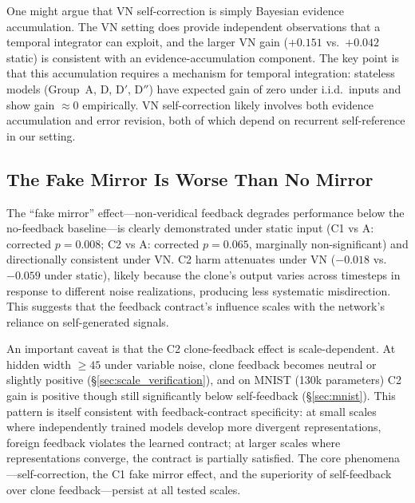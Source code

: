 \documentclass[10pt]{article}
\begin{document}
One might argue that VN self-correction is simply Bayesian evidence accumulation. The VN setting does provide independent observations that a temporal integrator can exploit, and the larger VN gain ($+0.151$ vs.\ $+0.042$ static) is consistent with an evidence-accumulation component. The key point is that this accumulation requires a mechanism for temporal integration: stateless models (Group~A, D, D$'$, D$''$) have expected gain of zero under i.i.d.\ inputs and show gain $\approx 0$ empirically. VN self-correction likely involves both evidence accumulation and error revision, both of which depend on recurrent self-reference in our setting.

\subsection{The Fake Mirror Is Worse Than No Mirror}

The ``fake mirror'' effect---non-veridical feedback degrades performance below the no-feedback baseline---is clearly demonstrated under static input (C1 vs A: corrected $p = 0.008$; C2 vs A: corrected $p = 0.065$, marginally non-significant) and directionally consistent under VN. C2 harm attenuates under VN ($-0.018$ vs.\ $-0.059$ under static), likely because the clone's output varies across timesteps in response to different noise realizations, producing less systematic misdirection. This suggests that the feedback contract's influence scales with the network's reliance on self-generated signals.

An important caveat is that the C2 clone-feedback effect is scale-dependent. At hidden width $\geq 45$ under variable noise, clone feedback becomes neutral or slightly positive (\S\ref{sec:scale_verification}), and on MNIST (130k parameters) C2 gain is positive though still significantly below self-feedback (\S\ref{sec:mnist}). This pattern is itself consistent with feedback-contract specificity: at small scales where independently trained models develop more divergent representations, foreign feedback violates the learned contract; at larger scales where representations converge, the contract is partially satisfied. The core phenomena---self-correction, the C1 fake mirror effect, and the superiority of self-feedback over clone feedback---persist at all tested scales.
\end{document}
